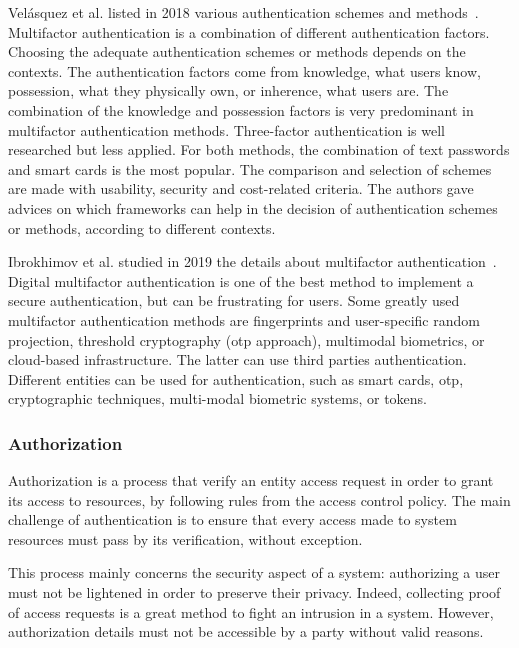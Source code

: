 Velásquez et al. listed in 2018 various authentication schemes and methods~\cite{velasquez_authentication_2018}. Multifactor authentication is a combination of different authentication factors. Choosing the adequate authentication schemes or methods depends on the contexts. The authentication factors come from knowledge, what users know, possession, what they physically own, or inherence, what users are. The combination of the knowledge and possession factors is very predominant in multifactor authentication methods. Three-factor authentication is well researched but less applied. For both methods, the combination of text passwords and smart cards is the most popular. The comparison and selection of schemes are made with usability, security and cost-related criteria. The authors gave advices on which \glspl{framework} can help in the decision of authentication schemes or methods, according to different contexts. %

Ibrokhimov et al. studied in 2019 the details about multifactor authentication~\cite{ibrokhimov_multi-factor_2019}. Digital multifactor authentication is one of the best method to implement a secure authentication, but can be frustrating for users. Some greatly used multifactor authentication methods are fingerprints and user-specific random projection, threshold cryptography (\gls{otp} approach), multimodal biometrics, or cloud-based infrastructure. The latter can use third parties authentication. Different entities can be used for authentication, such as smart cards, \gls{otp}, cryptographic techniques, multi-modal biometric systems, or \glspl{token}. %

\subsubsection{Authorization}
\label{subsubsec:state_review_results_authorization}

Authorization is a process that verify an entity access request in order to grant its access to resources, by following rules from the access control policy. The main challenge of authentication is to ensure that every access made to system resources must pass by its verification, without exception.

This process mainly concerns the security aspect of a system: authorizing a user must not be lightened in order to preserve their privacy. Indeed, collecting proof of access requests is a great method to fight an intrusion in a system. However, authorization details must not be accessible by a party without valid reasons. 

